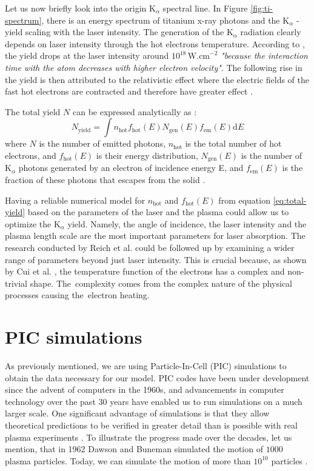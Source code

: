 Let us now briefly look into the origin $\mathrm{K}_\alpha$ spectral line. In Figure \ref{fig:ti-spectrum}, there is an energy spectrum of titanium x-ray photons and the $\mathrm{K}_\alpha$ - yield scaling with the laser intensity. The generation of the $\mathrm{K}_\alpha$ radiation clearly depends on laser intensity through the hot electrons temperature. According to \cite{schwoerer2004}, the yield drops at the laser intensity around $10^{18}\,\mathrm{W.cm}^{-2}$ \textit{"because the interaction time with the atom decreases with higher electron velocity"}. The following rise in the yield is then attributed to the relativistic effect where the electric fields of the fast hot electrons are contracted and therefore have greater effect \cite{schwoerer2004}.

The total yield $N$ can be expressed analytically as \cite{reich2000}:
\begin{equation}
	N_{\mathrm{yield}} = \int n_\mathrm{hot} f_\mathrm{hot}(E) N_\mathrm{gen}(E) f_\mathrm{em}(E)\mathrm{d}E
	\label{eq:total-yield}
\end{equation}
where $N$ is the number of emitted photons, $n_\mathrm{hot}$ is the total number of hot electrons, and $f_\mathrm{hot}(E)$ is their energy distribution, $N_\mathrm{gen}(E)$ is the number of $\mathrm{K}_\alpha$ photons generated by an electron of incidence energy E, and $f_\mathrm{em}(E)$ is the fraction of these photons that escapes from the solid \cite{reich2000}. 

Having a reliable numerical model for $n_\mathrm{hot}$ and $f_\mathrm{hot}(E)$ from equation \ref{eq:total-yield} based on the parameters of the laser and the plasma could allow us to optimize the $\mathrm{K}_\alpha$ yield. Namely, the angle of incidence, the laser intensity and the plasma length scale are the most important parameters for laser absorption. The research conducted by Reich et al. \cite{reich2000} could be followed up by examining a wider range of parameters beyond just laser intensity. This is crucial because, as shown by Cui et al. \cite{cui2013}, the temperature function of the electrons has a complex and non-trivial shape. The~complexity comes from the complex nature of the physical processes causing the~electron heating.

\section{PIC simulations}
As previously mentioned, we are using Particle-In-Cell (PIC) simulations to obtain the data necessary for our model. PIC codes have been under development since the advent of computers in the 1960s, and advancements in computer technology over the past 30 years have enabled us to run simulations on a much larger scale. One significant advantage of simulations is that they allow theoretical predictions to be verified in greater detail than is possible with real plasma experiments \cite{dawson1962}. To illustrate the progress made over the decades, let us mention, that in 1962 Dawson and Buneman simulated the motion of $1000$ plasma particles. Today, we can simulate the motion of more than $10^{10}$ particles \cite{tskhakaya2007}.

